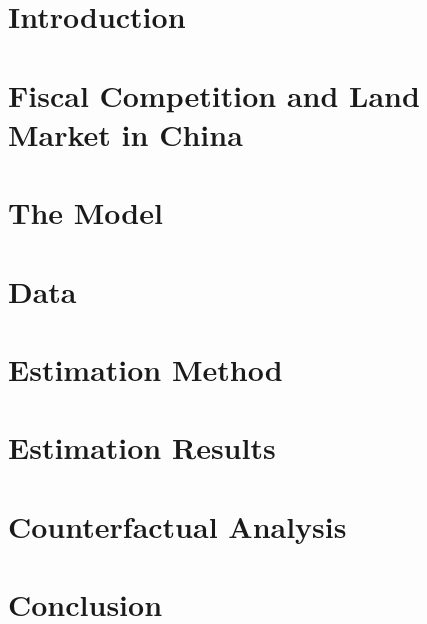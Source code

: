 \documentclass[11pt, english]{article}
\theoremstyle{plain}
\theoremstyle{definition}
\begin{document}
\begin{spacing}{1.5} %

  \section{Introduction}
  \label{sec:intro}
  

  \section{Fiscal Competition and Land Market in China}
  \label{sec:institution}
  

  \section{The Model}
  \label{sec:model}
  

  \section{Data}
  \label{sec:data}
  

  \section{Estimation Method}
  \label{sec:estimation}
  

  \section{Estimation Results}
  \label{sec:results}
  

  \section{Counterfactual Analysis}
  \label{sec:counterfactuals}
  

  \section{Conclusion}
  \label{sec:conclusion}
  

\end{spacing}
\end{document}
